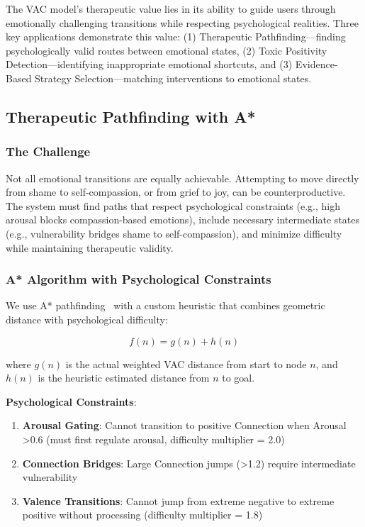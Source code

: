 \documentclass[10pt,twocolumn]{article}
\begin{document}
The VAC model's therapeutic value lies in its ability to guide users through emotionally challenging transitions while respecting psychological realities. Three key applications demonstrate this value: (1) Therapeutic Pathfinding—finding psychologically valid routes between emotional states, (2) Toxic Positivity Detection—identifying inappropriate emotional shortcuts, and (3) Evidence-Based Strategy Selection—matching interventions to emotional states.

\subsection{Therapeutic Pathfinding with A*}

\subsubsection{The Challenge}

Not all emotional transitions are equally achievable. Attempting to move directly from shame to self-compassion, or from grief to joy, can be counterproductive. The system must find paths that respect psychological constraints (e.g., high arousal blocks compassion-based emotions), include necessary intermediate states (e.g., vulnerability bridges shame to self-compassion), and minimize difficulty while maintaining therapeutic validity.

\subsubsection{A* Algorithm with Psychological Constraints}

We use A* pathfinding~\cite{hart1968} with a custom heuristic that combines geometric distance with psychological difficulty:

$$f(n) = g(n) + h(n)$$

where $g(n)$ is the actual weighted VAC distance from start to node $n$, and $h(n)$ is the heuristic estimated distance from $n$ to goal.

\textbf{Psychological Constraints}:

\begin{enumerate}
    \item \textbf{Arousal Gating}: Cannot transition to positive Connection when Arousal >0.6 (must first regulate arousal, difficulty multiplier = 2.0)
    \item \textbf{Connection Bridges}: Large Connection jumps (>1.2) require intermediate vulnerability
    \item \textbf{Valence Transitions}: Cannot jump from extreme negative to extreme positive without processing (difficulty multiplier = 1.8)
\end{enumerate}
\end{document}

